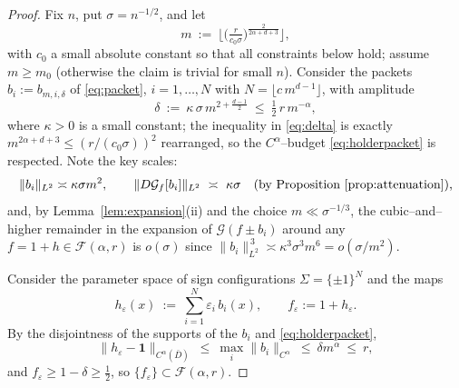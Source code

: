 \documentclass[11pt]{article}
\newcommand{\1}{\mathbf{1}}
\newcommand{\norm}[1]{\lVert #1\rVert}
\newcommand{\Gf}{\mathcal{G}}
\newcommand{\F}{\mathcal{F}}
\begin{document}
\begin{proof}
Fix $n$, put $\sigma=n^{-1/2}$, and let
\[
m\ :=\ \Big\lfloor\big(\tfrac{r}{c_0\sigma}\big)^{\frac{2}{2\alpha+d+3}}\Big\rfloor,
\]
with $c_0$ a small absolute constant so that all constraints below hold; assume
$m\ge m_0$ (otherwise the claim is trivial for small $n$). Consider the packets
$b_i:=b_{m,i,\delta}$ of \eqref{eq:packet}, $i=1,\dots,N$ with
$N=\lfloor c\,m^{d-1}\rfloor$, with amplitude
\begin{equation}\label{eq:delta}
\delta\ :=\ \kappa\,\sigma\,m^{2+\frac{d-1}{2}}\ \le\ \tfrac12\,r\,m^{-\alpha},
\end{equation}
where $\kappa>0$ is a small constant; the inequality in \eqref{eq:delta} is exactly
$m^{2\alpha+d+3}\le (r/(c_0\sigma))^2$ rearranged, so the $C^\alpha$--budget
\eqref{eq:holderpacket} is respected. Note the key scales:
\[
\norm{b_i}_{L^2}\asymp \kappa\sigma m^{2},\qquad
\norm{D\Gf_f[b_i]}_{L^2}\ \asymp\ \kappa\sigma
\quad\text{(by Proposition~\ref{prop:attenuation}),}
\]
and, by Lemma~\ref{lem:expansion}(ii) and the choice $m\ll\sigma^{-1/3}$,
the cubic--and--higher remainder in the expansion of
$\Gf(f\pm b_i)$ around any $f=1+h\in\F(\alpha,r)$ is
$o(\sigma)$ since $\norm{b_i}_{L^2}^{\,3}\asymp\kappa^3\sigma^3m^6=o(\sigma/m^2)$.

Consider the parameter space of sign configurations
$\Sigma=\{\pm1\}^{N}$ and the maps
\[
h_\varepsilon(x)\ :=\ \sum_{i=1}^N \varepsilon_i\, b_i(x),\qquad
f_\varepsilon:=1+h_\varepsilon .
\]
By the disjointness of the supports of the $b_i$ and \eqref{eq:holderpacket},
\[
\norm{h_\varepsilon-\1}_{C^\alpha(\bar D)}
\ \le\ \max_i\norm{b_i}_{C^\alpha}\ \le\ \delta m^\alpha\ \le\ r,
\]
and $f_\varepsilon\ge 1-\delta\ge\tfrac12$, so $\{f_\varepsilon\}\subset\F(\alpha,r)$.


\end{proof}
\end{document}
